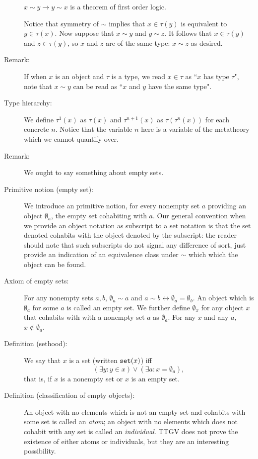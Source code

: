 \documentclass[12pt]{article}
\begin{document}
\begin{description}
$x \sim y\rightarrow y \sim x$ is a theorem of first order logic.

Notice that symmetry of $\sim$ implies that $x \in \tau(y)$ is equivalent to $y \in \tau(x)$.  Now suppose that $x \sim y$ and $y \sim z$.  It follows that
$x \in \tau(y)$ and $z \in \tau(y)$, so $x$ and $z$ are of the same type:  $x \sim z$ as desired.

\item[Remark:]  If when $x$ is an object and $\tau$ is a type, we read $x \in \tau$ as ``$x$ has type $\tau$", note that $x \sim y$ can be read as ``$x$ and $y$ have the same type".

\item[Type hierarchy:]  We define $\tau^1(x)$ as $\tau(x)$ and $\tau^{n+1}(x)$ as $\tau(\tau^n(x))$ for each concrete $n$.  Notice that the variable $n$ here is a variable of the metatheory which we cannot quantify over.

\item[Remark:]  We ought to say something about empty sets.

\item[Primitive notion (empty set):]  We introduce an primitive notion, for every nonempty set $a$ providing an object $\emptyset_{a}$, the empty set cohabiting with $a$.  Our general convention when we provide an object notation as subscript to a set notation is that the set denoted cohabits with the object denoted by the subscript:  the reader should note that such subscripts do not signal any difference of sort, just provide an indication of an equivalence class under $\sim$ which which the object can be found.

\item[Axiom of empty sets:]  For any nonempty sets $a,b$, $\emptyset_a \sim a$ and $a \sim b \leftrightarrow \emptyset_a = \emptyset_b$.  An object which is $\emptyset_a$ for some $a$ is called an empty set.  We further define $\emptyset_x$ for any object $x$ that cohabits with with a nonempty set $a$ as $\emptyset_a$.  For any $x$ and any $a$, $x \not\in \emptyset_a$.

\item[Definition (sethood):]  We say that $x$ is a set (written ${\tt set}(x)$) iff $$(\exists y:y \in x) \vee (\exists a:x = \emptyset_{a}), $$  that is, if $x$ is a nonempty set or $x$ is an empty set.

\item[Definition (classification of empty objects):]  An object with no elements which is not an empty set and cohabits with some set is called an {\em atom\/};  an object with no elements which does not cohabit with any set is called an {\em individual\/}.   TTGV does not prove the existence of either atoms or individuals, but they are an interesting possibility.


\end{description}
\end{document}
